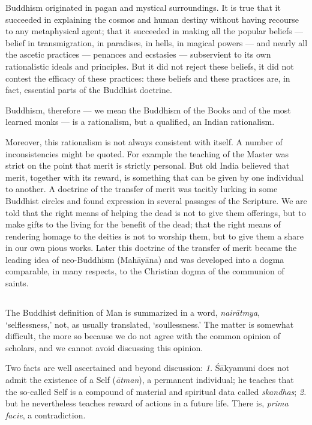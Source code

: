\documentclass[a4paper, 11pt, oneside, english, landscape]{article}
\begin{document}
Buddhism originated in pagan and mystical surroundings. It is true that it succeeded in explaining the cosmos and human destiny without having recourse to any metaphysical agent; that it succeeded in making all the popular beliefs --- belief in transmigration, in paradises, in hells, in magical powers --- and nearly all the ascetic practices --- penances and ecstasies --- subservient to its own rationalistic ideals and principles. But it did not reject these beliefs, it did not contest the efficacy of these practices: these beliefs and these practices are, in fact, essential parts of the Buddhist doctrine.

Buddhism, therefore --- we mean the Buddhism of the Books and of the most learned monks --- is a rationalism, but a qualified, an Indian rationalism.

Moreover, this rationalism is not always consistent with itself. A number of inconsistencies might be quoted. For example the teaching of the Master was strict on the point that merit is strictly personal. But old India believed that merit, together with its reward, is something that can be given by one individual to another. A doctrine of the transfer of merit was tacitly lurking in some Buddhist circles and found expression in several passages of the Scripture. We are told that the right means of helping the dead is not to give them offerings, but to make gifts to the living for the benefit of the dead; that the right means of rendering homage to the deities is not to worship them, but to give them a share in our own pious works. Later this doctrine of the transfer of merit became the leading idea of neo-Buddhism (Mahāyāna) and was developed into a dogma comparable, in many respects, to the Christian dogma of the communion of saints.

\subsection{}
\paragraph{}
The Buddhist definition of Man is summarized in a word, \emph{nairātmya}, `selflessness,' not, as usually translated, `soullessness.' The matter is somewhat difficult, the more so because we do not agree with the common opinion of scholars, and we cannot avoid discussing this opinion.

Two facts are well ascertained and beyond discussion: \emph{1.} Śākyamuni does not admit the existence of a Self (\emph{ātman}), a permanent individual; he teaches that the so-called Self is a compound of material and spiritual data called \emph{skandhas}; \emph{2.} but he nevertheless teaches reward of actions in a future life. There is, \emph{prima facie}, a contradiction.
\end{document}
